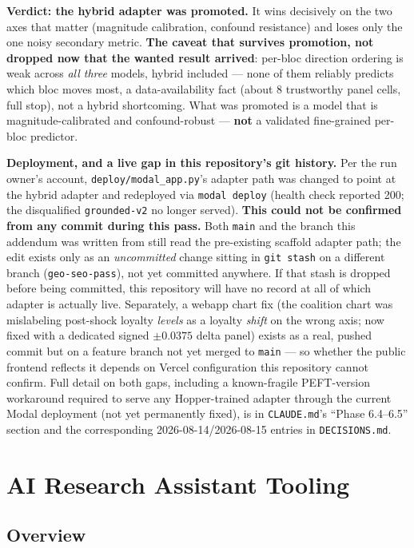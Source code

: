 \documentclass[11pt]{article}
\begin{document}
\textbf{Verdict: the hybrid adapter was promoted.} It wins decisively on the two axes
that matter (magnitude calibration, confound resistance) and loses only the one noisy
secondary metric. \textbf{The caveat that survives promotion, not dropped now that the
wanted result arrived}: per-bloc direction ordering is weak across \emph{all three}
models, hybrid included --- none of them reliably predicts which bloc moves most, a
data-availability fact (about 8 trustworthy panel cells, full stop), not a hybrid
shortcoming. What was promoted is a model that is magnitude-calibrated and
confound-robust --- \textbf{not} a validated fine-grained per-bloc predictor.

\textbf{Deployment, and a live gap in this repository's git history.} Per the run
owner's account, \texttt{deploy/modal\_app.py}'s adapter path was changed to point at
the hybrid adapter and redeployed via \texttt{modal deploy} (health check reported
200; the disqualified \texttt{grounded-v2} no longer served). \textbf{This could not be
confirmed from any commit during this pass.} Both \texttt{main} and the branch this
addendum was written from still read the pre-existing scaffold adapter path; the edit
exists only as an \emph{uncommitted} change sitting in \texttt{git stash} on a
different branch (\texttt{geo-seo-pass}), not yet committed anywhere. If that stash is
dropped before being committed, this repository will have no record at all of which
adapter is actually live. Separately, a webapp chart fix (the coalition chart was
mislabeling post-shock loyalty \emph{levels} as a loyalty \emph{shift} on the wrong
axis; now fixed with a dedicated signed $\pm0.0375$ delta panel) exists as a real,
pushed commit but on a feature branch not yet merged to \texttt{main} --- so whether
the public frontend reflects it depends on Vercel configuration this repository cannot
confirm. Full detail on both gaps, including a known-fragile PEFT-version workaround
required to serve any Hopper-trained adapter through the current Modal deployment
(not yet permanently fixed), is in \texttt{CLAUDE.md}'s ``Phase 6.4--6.5'' section and
the corresponding 2026-08-14/2026-08-15 entries in \texttt{DECISIONS.md}.

\appendix
\section{AI Research Assistant Tooling}

\subsection*{Overview}
\end{document}
